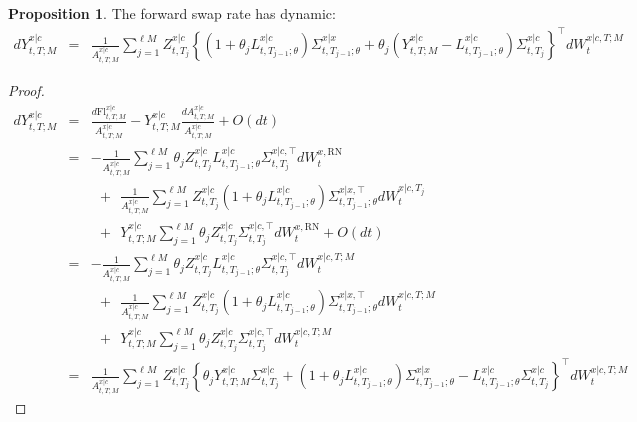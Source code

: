 \documentclass[11pt,english]{amsart}
\newcommand{\Fl}{\mathrm{Fl}}
\newcommand{\RN}{\mathrm{RN}}
\theoremstyle{definition}
\newtheorem{prop}{Proposition}
\begin{document}

\begin{prop}
The forward swap rate has dynamic:
\begin{eqnarray*}
  dY^{x|c}_{t,T;M}  &=&   \frac{1}{A^{x|c}_{t,T;M} }  \sum_{j=1}^{\ell M} Z^{x|c}_{t,T_j}  \left\{ (1+\theta_j L^{x|c}_{t,T_{j-1};\theta}) \Sigma^{x|x}_{t,T_{j-1};\theta}  + \theta_j ( Y^{x|c}_{t,T;M} - L^{x|c}_{t,T_{j-1};\theta} ) \Sigma^{x|c}_{t,T_j}  \right\}^\top dW_t^{x|c,T;M}
\end{eqnarray*}
\end{prop}

\begin{proof}
\begin{eqnarray*}
  dY^{x|c}_{t,T;M}  
  &=&  \frac{d\Fl^{x|c}_{t,T;M}}{A^{x|c}_{t,T;M} } -  Y^{x|c}_{t,T;M} \frac{dA^{x|c}_{t,T;M}}{A^{x|c}_{t,T;M} } + O(dt) \\
  &=& - \frac{1}{A^{x|c}_{t,T;M} } \sum_{j=1}^{\ell M} \theta_j Z^{x|c}_{t,T_j} L^{x|c}_{t,T_{j-1};\theta} \Sigma^{x|c,\top}_{t,T_j} dW_t^{x,\RN}  \\
  & & ~~+~~ \frac{1}{A^{x|c}_{t,T;M} } \sum_{j=1}^{\ell M} Z^{x|c}_{t,T_j} (1+\theta_j L^{x|c}_{t,T_{j-1};\theta}) \Sigma^{x|x,\top}_{t,T_{j-1};\theta} dW_t^{x|c,T_j}  \\ 
  & & ~~+~~  Y^{x|c}_{t,T;M}  \sum_{j=1}^{\ell M} \theta_j Z^{x|c}_{t,T_j} \Sigma^{x|c,\top}_{t,T_j} dW_t^{x,\RN}  + O(dt) \\
  &=& - \frac{1}{A^{x|c}_{t,T;M} } \sum_{j=1}^{\ell M} \theta_j Z^{x|c}_{t,T_j} L^{x|c}_{t,T_{j-1};\theta} \Sigma^{x|c,\top}_{t,T_j} dW_t^{x|c,T;M}  \\
  & & ~~+~~ \frac{1}{A^{x|c}_{t,T;M} } \sum_{j=1}^{\ell M} Z^{x|c}_{t,T_j} (1+\theta_j L^{x|c}_{t,T_{j-1};\theta}) \Sigma^{x|x,\top}_{t,T_{j-1};\theta} dW_t^{x|c,T;M}   \\ 
  & & ~~+~~  Y^{x|c}_{t,T;M}  \sum_{j=1}^{\ell M} \theta_j Z^{x|c}_{t,T_j} \Sigma^{x|c,\top}_{t,T_j} dW_t^{x|c,T;M} \\
  &=& \frac{1}{A^{x|c}_{t,T;M} }  \sum_{j=1}^{\ell M} Z^{x|c}_{t,T_j}  \left\{ \theta_j Y^{x|c}_{t,T;M} \Sigma^{x|c}_{t,T_j}  + (1+\theta_j L^{x|c}_{t,T_{j-1};\theta}) \Sigma^{x|x}_{t,T_{j-1};\theta}  - L^{x|c}_{t,T_{j-1};\theta} \Sigma^{x|c}_{t,T_j}  \right\}^\top dW_t^{x|c,T;M}
\end{eqnarray*}
\end{proof}
\end{document}
